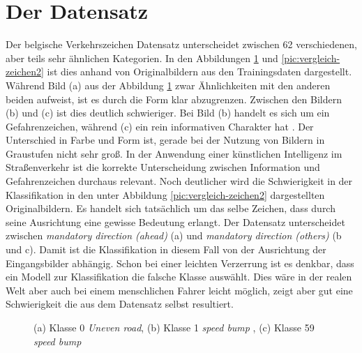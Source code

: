 \section{Der Datensatz}
Der belgische Verkehrszeichen Datensatz unterscheidet zwischen 62 verschiedenen, aber teils sehr ähnlichen Kategorien. In den Abbildungen \ref{pic:vergleich-zeichen1} und \ref{pic:vergleich-zeichen2} ist dies anhand von Originalbildern aus den Trainingsdaten dargestellt. Während Bild (a) aus der Abbildung \ref{pic:vergleich-zeichen1} zwar Ähnlichkeiten mit den anderen beiden aufweist, ist es durch die Form klar abzugrenzen. Zwischen den Bildern (b) und (c) ist dies deutlich schwieriger. Bei Bild (b) handelt es sich um ein Gefahrenzeichen, während (c) ein rein informativen Charakter hat \cite{road-sign-defs}. Der Unterschied in Farbe und Form ist, gerade bei der Nutzung von Bildern in Graustufen nicht sehr groß. In der Anwendung einer künstlichen Intelligenz im Straßenverkehr ist die korrekte Unterscheidung zwischen Information und Gefahrenzeichen durchaus relevant. 
Noch deutlicher wird die Schwierigkeit in der Klassifikation in den unter Abbildung \ref{pic:vergleich-zeichen2} dargestellten Originalbildern. Es handelt sich tatsächlich um das selbe Zeichen, dass durch seine Ausrichtung eine gewisse Bedeutung erlangt. Der Datensatz unterscheidet zwischen \textit{mandatory direction (ahead)} (a) und \textit{mandatory direction (others)} (b und c). 
Damit ist die Klassifikation in diesem Fall von der Ausrichtung der Eingangsbilder abhängig. Schon bei einer leichten Verzerrung ist es denkbar, dass ein Modell zur Klassifikation die falsche Klasse auswählt. Dies wäre in der realen Welt aber auch bei einem menschlichen Fahrer leicht möglich, zeigt aber gut eine Schwierigkeit die aus dem Datensatz selbst resultiert.

\begin{figure} [ht]
	\centering
	\subfloat[][]{\texttt{[image: 0]}}%
	\qquad
	\subfloat[][]{\texttt{[image: 1]}}%
	\qquad
	\subfloat[][]{\texttt{[image: 59]}}%
	\caption{(a) Klasse 0 \textit{Uneven road}, (b) Klasse 1 \textit{speed bump} , (c) Klasse 59 \textit{speed bump}}%
	\label{pic:vergleich-zeichen1}
\end{figure}


